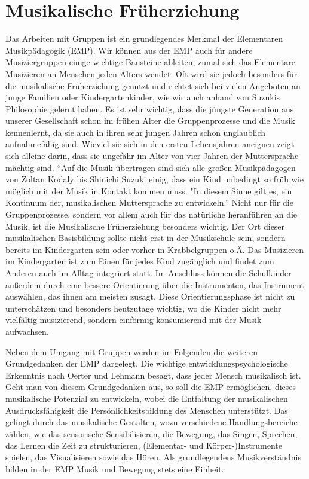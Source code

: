 \section{Musikalische Früherziehung}

Das Arbeiten mit Gruppen ist ein grundlegendes Merkmal der Elementaren
Musikpädagogik (EMP). Wir können aus der EMP auch für andere Musiziergruppen
einige wichtige Bausteine ableiten, zumal sich das Elementare Musizieren an
Menschen jeden Alters wendet.
\autocite[226]{busch:grundwissen_instrumentalpaedagogik} Oft wird sie jedoch
besonders für die musikalische Früherziehung genutzt und richtet sich bei vielen
Angeboten an junge Familien oder Kindergartenkinder, wie wir auch anhand von
Suzukis Philosophie gelernt haben. Es ist sehr wichtig, dass
die jüngste Generation aus unserer Gesellschaft schon im frühen Alter die
Gruppenprozesse und die Musik kennenlernt, da sie auch in ihren sehr jungen
Jahren schon unglaublich aufnahmefähig sind. Wieviel sie sich in den ersten
Lebensjahren aneignen zeigt sich alleine darin, dass sie ungefähr im Alter von
vier Jahren der Muttersprache mächtig sind. \enquote{Auf die Musik übertragen sind sich
alle großen Musikpädagogen von Zoltan Kodaly bis Shinichi Suzuki einig, dass ein
Kind unbedingt so früh wie möglich mit der Musik in Kontakt kommen muss. "In
diesem Sinne gilt es, ein Kontinuum der, musikalischen Muttersprache zu
entwickeln.} \autocite[45]{ernst:die_zukunftsfaehige_musikschule} Nicht nur für
die Gruppenprozesse, sondern vor allem auch für das natürliche heranführen an
die Musik, ist die Musikalische Früherziehung besonders wichtig. Der Ort dieser
musikalischen Basisbildung sollte nicht erst in der Musikschule sein, sondern
bereits im Kindergarten sein oder vorher in Krabbelgruppen o.Ä.
\autocite[43]{ernst:die_zukunftsfaehige_musikschule}
Das Musizieren im Kindergarten ist zum Einen für jedes Kind zugänglich und
findet zum Anderen auch im Alltag integriert statt. Im Anschluss können die
Schulkinder außerdem durch eine bessere Orientierung über die Instrumenten, das
Instrument auswählen, das ihnen am meisten zusagt. Diese Orientierungsphase ist
nicht zu unterschätzen und besonders heutzutage wichtig, wo die Kinder nicht
mehr vielfältig musizierend, sondern einförmig konsumierend mit der Musik
aufwachsen.\autocite[37]{ernst:die_zukunftsfaehige_musikschule}

Neben dem Umgang mit Gruppen werden im Folgenden die weiteren Grundgedanken der
EMP dargelegt. Die wichtige entwicklungspsychologische
Erkenntnis nach Oerter und Lehmann besagt, dass jeder Mensch
musikalisch ist.\autocite[88]{musikalische_begabung} Geht man von diesem
Grundgedanken aus, so soll die EMP ermöglichen, dieses musikalische Potenzial zu
entwickeln, wobei die Entfaltung der musikalischen Ausdrucksfähigkeit die
Persönlichkeitsbildung des Menschen unterstützt. Das gelingt durch das
musikalische Gestalten, wozu verschiedene Handlungsbereiche zählen, wie das
sensorische Sensibilisieren, die Bewegung, das Singen, Sprechen, das Lernen die
Zeit zu strukturieren, (Elementar-  und Körper-)Instrumente spielen, das
Visualisieren sowie das Hören.
\autocite[227]{busch:grundwissen_instrumentalpaedagogik} Als grundlegendens
Musikverständnis bilden in der EMP Musik und Bewegung stets eine Einheit.

